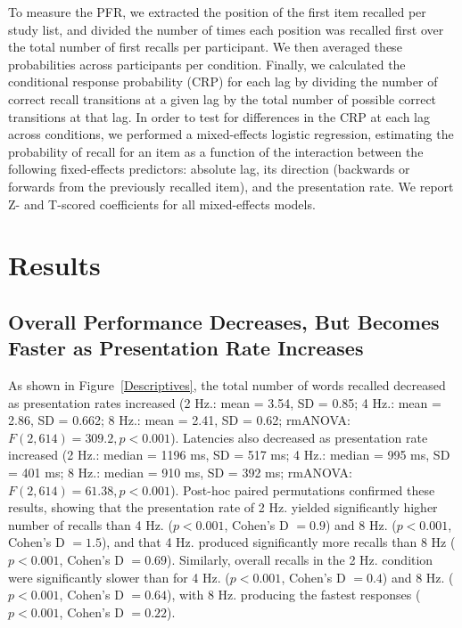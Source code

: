 \documentclass[10pt,letterpaper]{article}
\begin{document}
To measure the PFR, we extracted the position of the first item recalled per study list, and divided the number of times each position was recalled first over the total number of first recalls per participant. We then averaged these probabilities across participants per condition. Finally, we calculated the conditional response probability (CRP) for each lag by dividing the number of correct recall transitions at a given lag by the total number of possible correct transitions at that lag. In order to test for differences in the CRP at each lag across conditions, we performed a mixed-effects logistic regression, estimating the probability of recall for an item as a function of the interaction between the following fixed-effects predictors: absolute lag, its direction (backwards or forwards from the previously recalled item), and the presentation rate. We report Z- and T-scored coefficients for all mixed-effects models.

\section{Results}

\subsection{Overall Performance Decreases, But Becomes Faster as Presentation Rate Increases}

As shown in Figure~\ref{Descriptives}, the total number of words recalled decreased as presentation rates increased (2 Hz.: mean = 3.54, SD = 0.85; 4 Hz.: mean = 2.86, SD = 0.662; 8 Hz.: mean = 2.41, SD = 0.62; rmANOVA: $F(2, 614) = 309.2, p < 0.001$). Latencies also decreased as presentation rate increased (2 Hz.: median = 1196 ms, SD = 517 ms; 4 Hz.: median = 995 ms, SD = 401 ms; 8 Hz.: median = 910 ms, SD = 392 ms; rmANOVA: $F(2, 614) = 61.38, p < 0.001$). Post-hoc paired permutations confirmed these results, showing that the presentation rate of 2 Hz. yielded significantly higher number of recalls than 4 Hz. ($p < 0.001$, Cohen's D $= 0.9$) and 8 Hz. ($p < 0.001$, Cohen's D $= 1.5$), and that 4 Hz. produced significantly more recalls than 8 Hz ($p < 0.001$, Cohen's D $= 0.69$). Similarly, overall recalls in the 2 Hz. condition were significantly slower than for 4 Hz. ($p < 0.001$, Cohen's D $= 0.4$) and 8 Hz. ($p < 0.001$, Cohen's D $= 0.64$), with 8 Hz. producing the fastest responses ($p < 0.001$, Cohen's D $= 0.22$). 
\end{document}
